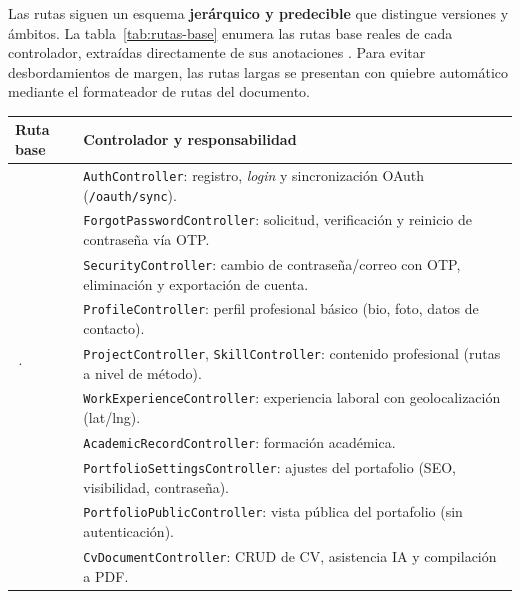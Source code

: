 Las rutas siguen un esquema \textbf{jerárquico y predecible} que distingue versiones y
ámbitos. La tabla~\ref{tab:rutas-base} enumera las rutas base reales de cada controlador,
extraídas directamente de sus anotaciones . Para evitar
desbordamientos de margen, las rutas largas se presentan con quiebre automático mediante
el formateador de rutas del documento.

\vspace{0.2cm}
\noindent
\renewcommand{\arraystretch}{1.35}
\fontsize{8}{9.6}\selectfont\sffamily
\begin{tabularx}{\textwidth}{|L{4.5cm}|Y|}
\hline
{}
\sffamily\textbf{Ruta base} & \sffamily\textbf{Controlador y responsabilidad} \\
\hline
{} & \texttt{AuthController}: registro, \textit{login} y sincronización OAuth (\texttt{/oauth/sync}). \\
\hline
{}
 & \texttt{ForgotPasswordController}: solicitud, verificación y reinicio de contraseña vía OTP. \\
\hline
{} & \texttt{SecurityController}: cambio de contraseña/correo con OTP, eliminación y exportación de cuenta. \\
\hline
{}
 & \texttt{ProfileController}: perfil profesional básico (bio, foto, datos de contacto). \\
\hline
{} ·  & \texttt{ProjectController}, \texttt{SkillController}: contenido profesional (rutas a nivel de método). \\
\hline
{}
 & \texttt{WorkExperienceController}: experiencia laboral con geolocalización (lat/lng). \\
\hline
{} & \texttt{AcademicRecordController}: formación académica. \\
\hline
{}
 & \texttt{PortfolioSettingsController}: ajustes del portafolio (SEO, visibilidad, contraseña). \\
\hline
{} & \texttt{PortfolioPublicController}: vista pública del portafolio (sin autenticación). \\
\hline
{}
 & \texttt{CvDocumentController}: CRUD de CV, asistencia IA y compilación a PDF. \\

\end{tabularx}
